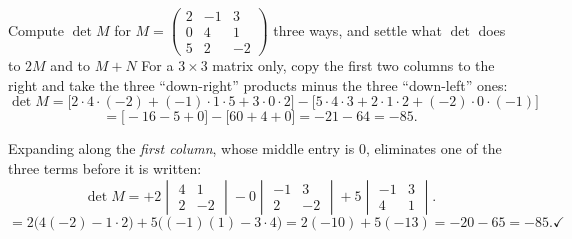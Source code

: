 \begin{worked}{Compute $\det M$ for $M=\begin{pmatrix}2&-1&3\\0&4&1\\5&2&-2\end{pmatrix}$ three ways, and settle what $\det$ does to $2M$ and to $M+N$}
For a $3\times3$ matrix only, copy the first two columns to the right and
take the three ``down-right'' products minus the three ``down-left'' ones:
\[
  \det M=\bigl[2\cdot4\cdot(-2)+(-1)\cdot1\cdot5+3\cdot0\cdot2\bigr]
        -\bigl[5\cdot4\cdot3+2\cdot1\cdot2+(-2)\cdot0\cdot(-1)\bigr]
\]
\[
  =\bigl[-16-5+0\bigr]-\bigl[60+4+0\bigr]=-21-64=\boxed{-85} .
\]

Expanding along the \emph{first column}, whose middle entry is $0$, eliminates
one of the three terms before it is written:
\[
  \det M=+2\begin{vmatrix}4&1\\2&-2\end{vmatrix}
        -0\begin{vmatrix}-1&3\\2&-2\end{vmatrix}
        +5\begin{vmatrix}-1&3\\4&1\end{vmatrix} .
\]
\[
  =2\bigl(4(-2)-1\cdot2\bigr)+5\bigl((-1)(1)-3\cdot4\bigr)
  =2(-10)+5(-13)=-20-65=-85 . \checkmark
\]


\end{worked}
